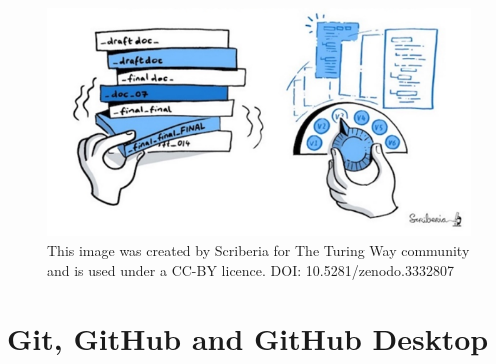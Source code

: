 \documentclass[
  letterpaper,
  DIV=11,
  numbers=noendperiod]{scrreprt}
\begin{document}
\begin{figure}

{\centering \includegraphics{./images/paste-EB447856.png}

}

\caption{This image was created by Scriberia for The Turing Way
community and is used under a CC-BY licence. DOI:
10.5281/zenodo.3332807}

\end{figure}

\hypertarget{git-github-and-github-desktop}{%
\section{Git, GitHub and GitHub
Desktop}\label{git-github-and-github-desktop}}
\end{document}
